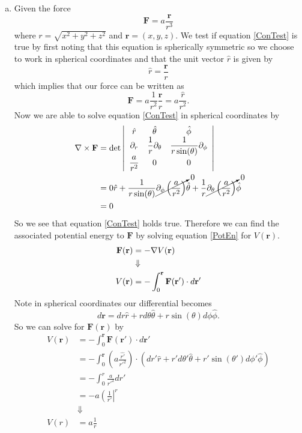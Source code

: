\documentclass[11pt]{article}
\numberwithin{equation}{section}
\begin{document}
\begin{enumerate}[(a)]
\item Given the force
$$\mathbf{F} = a\frac{\mathbf{r}}{r^3}$$
where $r = \sqrt{x^2+y^2+z^2}$ and $\mathbf{r} = (x,y,z)$. We test if equation \ref{ConTest} is true by first noting that this equation is spherically symmetric so we choose to work in spherical coordinates 
and that the unit vector $\hat{r}$ is given by
$$\hat{r} = \frac{\mathbf{r}}{r}$$
which implies that our force can be written as
$$\mathbf{F} = a\frac{1}{r^2}\frac{\mathbf{r}}{r} = a\frac{\hat{r}}{r^2}.$$
Now we are able to solve equation \ref{ConTest} in spherical coordinates by
\begin{align*}
\bold\nabla\times\mathbf{F} &= \det\left|\begin{array}{ccc} 
       \hat{r}       &\hat{\theta}                   &\hat{\phi}\\
       \partial_r    &\dfrac{1}{r}\partial_{\theta}  &\dfrac{1}{r\sin(\theta)}\partial_{\phi}\\
       \dfrac{a}{r^2} &0                             &0
                          \end{array}\right|\\
&= 0\hat{r} + \frac{1}{r\sin(\theta)}\cancelto{0}{\partial_{\phi}\left(\frac{a}{r^2}\right)}\hat{\theta} + \frac{1}{r}\cancelto{0}{\partial_{\theta}\left(\frac{a}{r^2}\right)}\hat{\phi}\\
&= 0
\end{align*}
So we see that equation \ref{ConTest} holds true. Therefore we can find the associated 
potential energy to $\mathbf{F}$ by solving equation \ref{PotEn} for $V(\mathbf{r})$. 
\begin{align*}
\mathbf{F}(\mathbf{r}) &= -\bold\nabla V(\mathbf{r})\\
&\Downarrow\\
V(\mathbf{r}) &= -\int_{0}^{\mathbf{r}}\mathbf{F}(\mathbf{r'})\cdot d\mathbf{r'}
\end{align*}
Note in spherical coordinates our differential becomes
$$d\mathbf{r} = dr\hat{r} + rd\theta\hat{\theta} + r\sin(\theta)d\phi\hat{\phi}.$$
So we can solve for $\mathbf{F}(\mathbf{r})$ by
\begin{align*}
V(\mathbf{r}) &= -\int_{0}^{\mathbf{r}}\mathbf{F}(\mathbf{r'})\cdot d\mathbf{r'}\\
&= -\int_{0}^{\mathbf{r}}\left(a\frac{\hat{r'}}{r'^2}\right)\cdot\left(dr'\hat{r} + r'd\theta'\hat{\theta} + r'\sin(\theta')d\phi'\hat{\phi}\right)\\
&= -\int_{0}^{r}\frac{a}{r'^2}dr' \\
&= -a\left(\frac{1}{r'}\right|^{r} \\
&\Downarrow\\
V(r) &= a\frac{1}{r}
\end{align*}


\end{enumerate}
\end{document}
